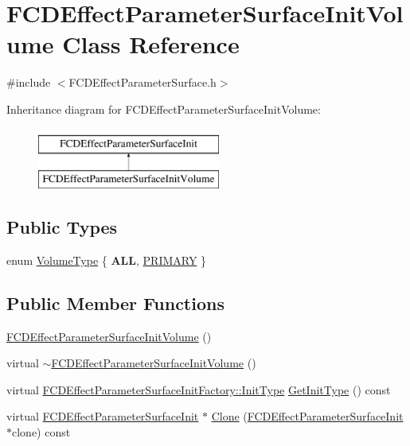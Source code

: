 \hypertarget{classFCDEffectParameterSurfaceInitVolume}{
\section{FCDEffectParameterSurfaceInitVolume Class Reference}
\label{classFCDEffectParameterSurfaceInitVolume}
}


{\ttfamily \#include $<$FCDEffectParameterSurface.h$>$}

Inheritance diagram for FCDEffectParameterSurfaceInitVolume:\begin{figure}[H]
\begin{center}
\leavevmode
\includegraphics[height=2.000000cm]{classFCDEffectParameterSurfaceInitVolume}
\end{center}
\end{figure}
\subsection*{Public Types}
\begin{DoxyCompactItemize}
\item 
enum \hyperlink{classFCDEffectParameterSurfaceInitVolume_a26c9418850b0c0d5a6c685b4ce4d890b}{VolumeType} \{ {\bfseries ALL}, 
\hyperlink{classFCDEffectParameterSurfaceInitVolume_a26c9418850b0c0d5a6c685b4ce4d890ba13ca69673f7e1aa87c61d5ef49df4512}{PRIMARY}
 \}
\end{DoxyCompactItemize}
\subsection*{Public Member Functions}
\begin{DoxyCompactItemize}
\item 
\hyperlink{classFCDEffectParameterSurfaceInitVolume_a06132d8a624304e2b2a738d57eeaeb0f}{FCDEffectParameterSurfaceInitVolume} ()
\item 
virtual \hyperlink{classFCDEffectParameterSurfaceInitVolume_a131f222e9900bc43683051e97c243ea0}{$\sim$FCDEffectParameterSurfaceInitVolume} ()
\item 
virtual \hyperlink{classFCDEffectParameterSurfaceInitFactory_a65e74f1159865702cac5236dd5d83892}{FCDEffectParameterSurfaceInitFactory::InitType} \hyperlink{classFCDEffectParameterSurfaceInitVolume_ad0490f5d50b8babd77b3294277f4fde5}{GetInitType} () const 
\item 
virtual \hyperlink{classFCDEffectParameterSurfaceInit}{FCDEffectParameterSurfaceInit} $\ast$ \hyperlink{classFCDEffectParameterSurfaceInitVolume_a54cdfc576b05fe56d87c1dc1c2fe211a}{Clone} (\hyperlink{classFCDEffectParameterSurfaceInit}{FCDEffectParameterSurfaceInit} $\ast$clone) const 
\end{DoxyCompactItemize}
